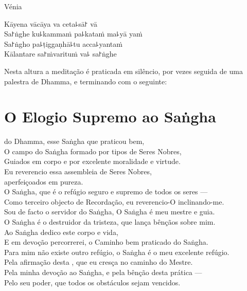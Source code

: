 \enlargethispage{\baselineskip}

\vfill

\begin{instruction}
  Vénia
\end{instruction}

Kāyena vācāya va ceta꜕sā꜓ vā\\
Sa꜓ṅghe ku꜕kammaṁ pa꜕kataṁ ma꜕yā yaṁ\\
Sa꜓ṅgho pa꜕ṭiggaṇhā꜕tu acca꜕yantaṁ\\
Kālantare sa꜓ṁvarituṁ va꜕ sa꜓ṅghe

\vfill

\begin{instruction}
  Nesta altura a meditação é praticada em silêncio, por vezes seguida de uma palestra de Dhamma, e terminando com o seguinte:
\end{instruction}

\clearpage

\nextChapterUseDelegatedPageNumber

\chapter{O Elogio Supremo ao Saṅgha}

\begin{leader}
\end{leader}

 do Dhamma, esse Saṅgha que praticou bem,\\
O campo do Saṅgha formado por  tipos de Seres Nobres,\\
Guiados em corpo e  por excelente moralidade e virtude.\\
Eu reverencio essa assembleia de Seres Nobres,\\
\vin aperfeiçoados em pureza.\\
O Saṅgha, que é o refúgio seguro e supremo de todos os seres ---\\
Como terceiro objecto de Recordação, eu reverencio-O inclinando-me.\\
Sou de facto o servidor do Saṅgha, O Saṅgha é meu mestre e guia.\\
O Saṅgha é o destruidor da tristeza, que lança bênçãos sobre mim.\\
Ao Saṅgha dedico este corpo e vida,\\
E em devoção percorrerei, o Caminho bem praticado do Saṅgha.\\
Para mim não existe outro refúgio, o Saṅgha é o meu excelente refúgio.\\
Pela afirmação desta , que eu cresça no caminho do Mestre.\\
Pela minha devoção ao Saṅgha, e pela bênção desta prática ---\\
Pelo seu poder, que todos os obstáculos sejam vencidos.

